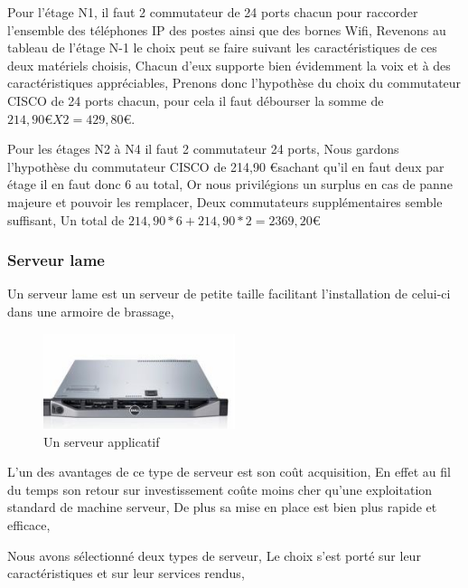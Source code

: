 Pour l'étage N1, il faut 2 commutateur de 24 ports chacun pour raccorder l'ensemble des téléphones IP des postes ainsi que des bornes Wifi,
Revenons au tableau de l'étage N-1 le choix peut se faire suivant les caractéristiques de ces deux matériels choisis,
Chacun d'eux supporte bien évidemment la voix et à des caractéristiques appréciables,
Prenons donc l'hypothèse du choix du commutateur CISCO de 24 ports chacun, pour cela il faut débourser la somme de $214,90 \euro    X 2 = 429,80  \euro$.

Pour les étages N2 à N4 il faut 2 commutateur 24 ports,
Nous gardons l'hypothèse du commutateur CISCO de 214,90  \euro    sachant qu'il en faut deux par étage il en faut donc 6 au total,
Or nous privilégions un surplus en cas de panne majeure et pouvoir les remplacer,
Deux commutateurs supplémentaires semble suffisant,
Un total de $214,90 * 6 + 214,90 * 2 = 2369,20  \euro    $



\subsubsection{Serveur lame }

Un serveur lame est un serveur de petite taille facilitant l'installation de celui-ci dans une armoire de brassage,

\begin{figure}[!ht]
    \center
    \includegraphics[width=0.5\textwidth]{./images/13.png}
    \caption{Un serveur applicatif}
\end{figure}

L'un des  avantages de ce type de serveur est son coût acquisition,
En effet au fil du temps son retour sur investissement coûte moins cher qu'une exploitation standard de machine serveur,
De plus sa mise en place est bien plus rapide et efficace,

Nous avons sélectionné deux types de serveur, Le choix s'est porté sur leur caractéristiques et sur leur services rendus,

